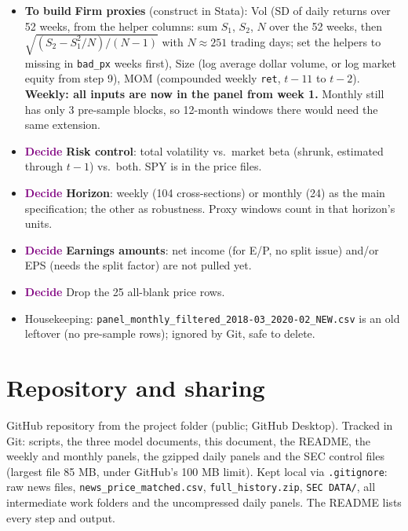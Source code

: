 \documentclass[11pt]{article}
\newcommand{\todo}{\textcolor{BurntOrange}{\textbf{To build}}}
\newcommand{\decide}{\textcolor{Purple}{\textbf{Decide}}}
\newcommand{\var}[1]{\texttt{#1}}
\begin{document}
\begin{itemize}
  ``\% from 0'' = share of flags where the baseline was 0. Reading: a longer baseline removes the zero-baseline problem (the 52 weeks of history are already in the weekly panel); the high flag rate comes from ``any increase'', and a minimum jump ($\ge 2\times$ baseline and $\ge 3$ articles) brings it to 8.6\%; dropping thinly covered firms halves the sample, so it suits a robustness check. Options under consideration: 52-week baseline with a minimum jump (sensitivity at 1.5$\times$ and 3$\times$), or the continuous log version with a 52-week baseline. Monthly panel: a long baseline needs the same back-extension as the weekly panel (only 3 pre-sample months now).
  \item \todo{} \textbf{Firm proxies} (construct in Stata): Vol (SD of daily returns over 52 weeks, from the helper columns: sum $S_1$, $S_2$, $N$ over the 52 weeks, then $\sqrt{(S_2 - S_1^2/N)/(N-1)}$ with $N \approx 251$ trading days; set the helpers to missing in \var{bad\_px} weeks first), Size (log average dollar volume, or log market equity from step 9), MOM (compounded weekly \var{ret}, $t-11$ to $t-2$). \textbf{Weekly: all inputs are now in the panel from week 1.} Monthly still has only 3 pre-sample blocks, so 12-month windows there would need the same extension.
  \item \decide{} \textbf{Risk control}: total volatility vs.\ market beta (shrunk, estimated through $t-1$) vs.\ both. SPY is in the price files.
  \item \decide{} \textbf{Horizon}: weekly (104 cross-sections) or monthly (24) as the main specification; the other as robustness. Proxy windows count in that horizon's units.
  \item \decide{} \textbf{Earnings amounts}: net income (for E/P, no split issue) and/or EPS (needs the split factor) are not pulled yet.
  \item \decide{} Drop the 25 all-blank price rows.
  \item Housekeeping: \var{panel\_monthly\_filtered\_2018-03\_2020-02\_NEW.csv} is an old leftover (no pre-sample rows); ignored by Git, safe to delete.
\end{itemize}

\section{Repository and sharing}

GitHub repository from the project folder (public; GitHub Desktop). Tracked in Git: scripts, the three model documents, this document, the README, the weekly and monthly panels, the gzipped daily panels and the SEC control files (largest file 85 MB, under GitHub's 100 MB limit). Kept local via \var{.gitignore}: raw news files, \var{news\_price\_matched.csv}, \var{full\_history.zip}, \var{SEC DATA/}, all intermediate work folders and the uncompressed daily panels. The README lists every step and output.
\end{document}
